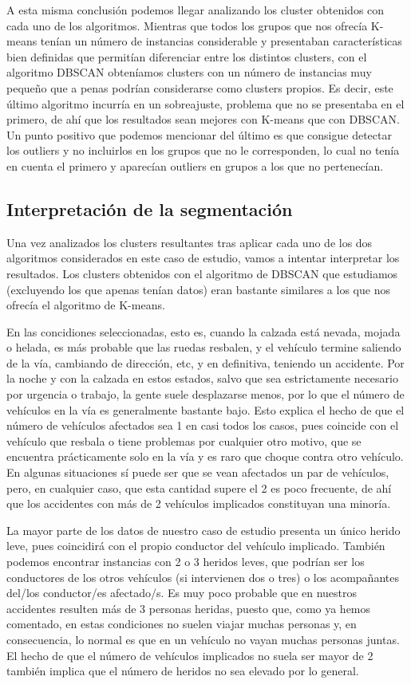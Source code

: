 \documentclass[a4paper,11pt]{book}
\begin{document}
A esta misma conclusión podemos llegar analizando los cluster obtenidos con cada uno de los algoritmos. Mientras que todos los grupos que nos ofrecía K-means tenían un número de instancias considerable y presentaban características bien definidas que permitían diferenciar entre los distintos clusters, con el algoritmo DBSCAN obteníamos clusters con un número de instancias muy pequeño que a penas podrían considerarse como clusters propios. Es decir, este último algoritmo incurría en un sobreajuste, problema que no se presentaba en el primero, de ahí que los resultados sean mejores con K-means que con DBSCAN. Un punto positivo que podemos mencionar del último es que consigue detectar los outliers y no incluirlos en los grupos que no le corresponden, lo cual no tenía en cuenta el primero y aparecían outliers en grupos a los que no pertenecían. 


\newpage
\subsection{Interpretación de la segmentación}
Una vez analizados los clusters resultantes tras aplicar cada uno de los dos algoritmos considerados en este caso de estudio, vamos a intentar interpretar los resultados. Los clusters obtenidos con el algoritmo de DBSCAN  que estudiamos (excluyendo los que apenas tenían datos) eran bastante similares a los que nos ofrecía el algoritmo de K-means.

En las concidiones seleccionadas, esto es, cuando la calzada está nevada, mojada o helada, es más probable que las ruedas resbalen, y el vehículo termine saliendo de la vía, cambiando de dirección, etc, y en definitiva, teniendo un accidente. Por la noche y con la calzada en estos estados, salvo que sea estrictamente necesario por urgencia o trabajo, la gente suele desplazarse menos, por lo que el número de vehículos en la vía es generalmente bastante bajo. Esto explica el hecho de que el número de vehículos afectados sea 1 en casi todos los casos, pues coincide con el vehículo que resbala o tiene problemas por cualquier otro motivo, que se encuentra prácticamente solo en la vía y es raro que choque contra otro vehículo. En algunas situaciones sí puede ser que se vean afectados un par de vehículos, pero, en cualquier caso, que esta cantidad supere el 2 es poco frecuente, de ahí que los accidentes con más de 2 vehículos implicados constituyan una minoría. 

La mayor parte de los datos de nuestro caso de estudio presenta un único herido leve, pues coincidirá con el propio conductor del vehículo implicado. También podemos encontrar instancias con 2 o 3 heridos leves, que podrían ser los conductores de los otros vehículos (si intervienen dos o tres) o los acompañantes del/los conductor/es afectado/s. Es muy poco probable que en nuestros accidentes resulten más de 3 personas heridas, puesto que, como ya hemos comentado, en estas condiciones no suelen viajar muchas personas y, en consecuencia, lo normal es que en un vehículo no vayan muchas personas juntas. El hecho de que el número de vehículos implicados no suela ser mayor de 2 también implica que el número de heridos no sea elevado por lo general. 
\end{document}
